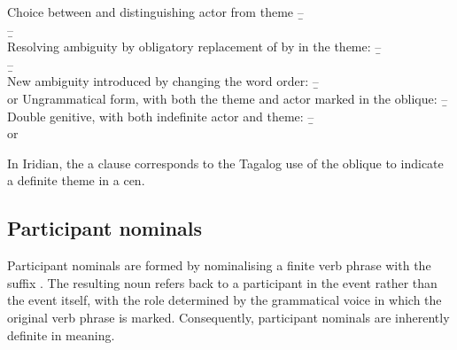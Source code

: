 \pex[interpartskip=0pt]
    \a Choice between \Obl{} and \Gen{} distinguishing actor from theme
    \beginsubsub{}
        \b{--}{\\ }
        \b{--}{\\ }
    \endsubsub
    \a Resolving ambiguity by obligatory replacement of \Gen{} by \Obl{} in the theme:
    \beginsubsub
        \b{--}{\\
        }
        \b{--}{\\
        }
    \endsubsub
    \a New ambiguity introduced by changing the word order:
    \beginsubsub
        \b{--} {\\
         or }
    \endsubsub
    \a Ungrammatical form, with both the theme and actor marked in the oblique:
    \beginsubsub
        \b{--}{\ljudge{*}\\
        }
    \endsubsub
    \a Double genitive, with both indefinite actor and theme:
    \beginsubsub
        \b{--}{\\
         or } 
    \endsubsub
\xe


In Iridian, the a  clause corresponds to the Tagalog use
of the oblique to indicate a definite theme in a {\sc cen}. 




\subsection{Participant nominals}

Participant nominals are formed by nominalising a finite verb phrase with the
suffix . The resulting noun refers back to a participant in the event
rather than the event itself, with the role determined by the grammatical voice
in which the original verb phrase is marked. Consequently, participant nominals
are inherently definite in meaning.

